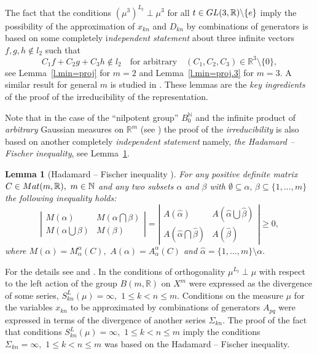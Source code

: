 \documentclass[preprint,12pt]{elsarticle}
\newtheorem{lem}[thm]{Lemma}
\numberwithin{equation}{section}
\begin{document}
%
\begin{rem}
\label{r.key-lemma2}
The fact that the conditions $(\mu^3)^{L_{t}}\!\perp\! \mu^3$ for all $t\in {\rm GL}(3,{\mathbb
R})\backslash{\{e\}}$ imply the possibility of the approximation of $x_{kn}$ and $D_{kn}$ 
by combinations of generators
is based on some
completely i{\it ndependent statement} about three infinite vectors $f,g,h\not \in l_2$
such that 
\begin{equation}
 \label{not-in-l_2}
C_1 f+C_2 g+C_3 h\not \in l_2\quad \text{for arbitrary}\quad (C_1,C_2,C_3)\in {\mathbb R}^3\setminus\{0\},
\end{equation}
see Lemma~\ref{l.min=proj} for $m=2$ \cite{KosJFA17}
and Lemma~\ref{l.min=proj.3} for $m=3$. 
%
A similar result for general $m$ is studied in \cite{Kos-m-Arx23}.
%
These  lemmas are the {\it key ingredients}
of the proof of the irreducibility of the representation.
\end{rem}
\begin{rem}
\label{r.key-lemma}
Note that in the case of the ``nilpotent group'' $B_0^{\mathbb N}$ and the infinite  product of {\it arbitrary}  Gaussian measures on ${\mathbb R}^m$ 
(see \cite{KosAlb06J}) the  proof of the {\it irreducibility} is also  based on another  completely {\it independent statement} namely,  
{\it the Hadamard -- Fischer inequality}, see Lemma~\ref{l.det(det)1}.
%
%
\begin{lem}[Hadamard -- Fischer inequality
\cite{HornJon89,HornJon91}]
\label{l.det(det)1}  For any
positive definite matrix $C\in{\rm Mat}(m,{\mathbb
R}),\,\,m\in{\mathbb N}$ and  any two subsets $\alpha$ and $\beta$
with $\emptyset\subseteq\alpha,\,\beta\subseteq\{1,...,m\}$ the
following inequality holds:
\begin{equation}
\label{det(det)1}
 \left|\begin{array}{cc}
M(\alpha)&M(\alpha\bigcap\beta)\\
M(\alpha\bigcup\beta)&M(\beta)
\end{array}\right|=
 \left|\begin{array}{cc}
A(\hat{\alpha})&A(\hat{\alpha}\bigcup\hat{\beta})\\
A(\hat{\alpha}\bigcap\hat{\beta})&A(\hat{\beta})
\end{array}\right|
\geq 0,
\end{equation}
where $M(\alpha)=M^\alpha_\alpha(C),\,\,
A(\alpha)=A^\alpha_\alpha(C)$ and
$\hat{\alpha}=\{1,...,m\}\setminus\alpha.$
\end{lem}
%
For the details see \cite[p.573]{HornJon89} and \cite[Chapter
2.5, problem 36]{HornJon91}.
In \cite{KosAlb06J} the conditions of orthogonality $\mu^{L_{t}}\perp \mu$ with respect to the left action of the group $B(m,{\mathbb R})$ on $X^m$ were expressed as the divergence of some series, $S^L_{kn}(\mu)=\infty,\,\,1\leq k<n\leq m$.
%
Conditions on the measure $\mu$ for the variables $x_{kn}$ to be approximated
by combinations of generators $A_{pq}$ were expressed in terms of the divergence of another series $\Sigma_{kn}$. 
%
The proof of the fact that conditions $S^L_{kn}(\mu)=\infty,\,\,1\leq\! k\!<\!n\!\leq m$ imply the conditions
$\Sigma_{kn}=\infty,\,\,1\leq k<n\leq m$ was based on the
Hadamard -- Fischer inequality.
\end{rem}
%
\end{document}
